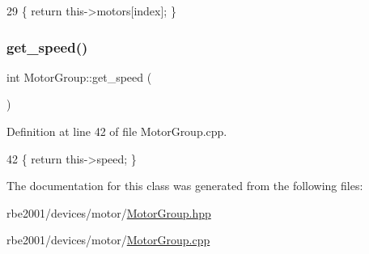 \begin{DoxyCode}
29 \{ \textcolor{keywordflow}{return} this->motors[index]; \}
\end{DoxyCode}
\mbox{\label{class_motor_group_a3f1a21bc3192613adecf364c839b2fed}} 
\subsubsection{\texorpdfstring{get\+\_\+speed()}{get\_speed()}}
{\footnotesize\ttfamily int Motor\+Group\+::get\+\_\+speed (\begin{DoxyParamCaption}{ }\end{DoxyParamCaption})}



Definition at line 42 of file Motor\+Group.\+cpp.


\begin{DoxyCode}
42 \{ \textcolor{keywordflow}{return} this->speed; \}
\end{DoxyCode}


The documentation for this class was generated from the following files\+:\begin{DoxyCompactItemize}
\item 
rbe2001/devices/motor/\hyperlink{_motor_group_8hpp}{Motor\+Group.\+hpp}\item 
rbe2001/devices/motor/\hyperlink{_motor_group_8cpp}{Motor\+Group.\+cpp}\end{DoxyCompactItemize}
